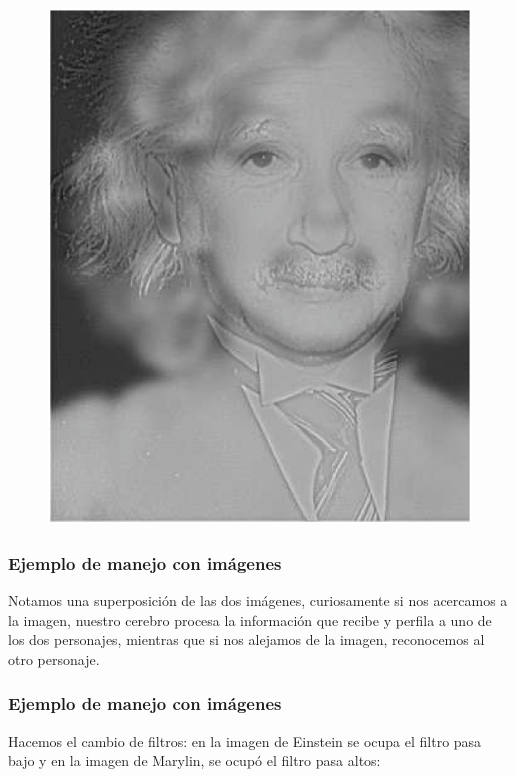 \begin{frame}[plain]
\begin{figure}[H]
    \centering
    \includegraphics[scale=0.3]{Imagenes/Einstein_Marylin_AB_01.eps}
    \label{fig:figuraEpa_Mpb}
\end{figure}
\end{frame}
\begin{frame}
\frametitle{Ejemplo de manejo con imágenes}
Notamos una superposición de las dos imágenes, \pause curiosamente si nos acercamos a la imagen, nuestro cerebro procesa la información que recibe y perfila a uno de los dos personajes, \pause mientras que si nos alejamos de la imagen, reconocemos al otro personaje.
\end{frame}
\begin{frame}
\frametitle{Ejemplo de manejo con imágenes}
Hacemos el cambio de filtros: \pause en la imagen de Einstein se ocupa el filtro pasa bajo y en la imagen de Marylin, se ocupó el filtro pasa altos:
\end{frame}
